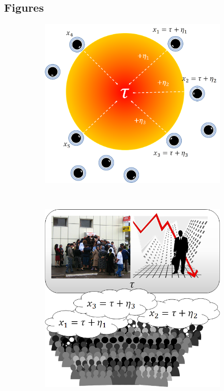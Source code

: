 \documentclass[12pt]{article}
\begin{document}


\newpage
\subsection*{Figures}

\begin{figure}[ht!]
    \centering\begin{subfigure}[t]{0.5\textwidth}
        \centering
        \includegraphics[width=1\textwidth]{figures/firefighting.png}
        \caption{}
    \end{subfigure}%
    ~ 
    \begin{subfigure}[t]{0.5\textwidth}
        \centering
        \includegraphics[width=1\textwidth]{figures/bankrun.png}

\end{subfigure}
\end{figure}
\end{document}
